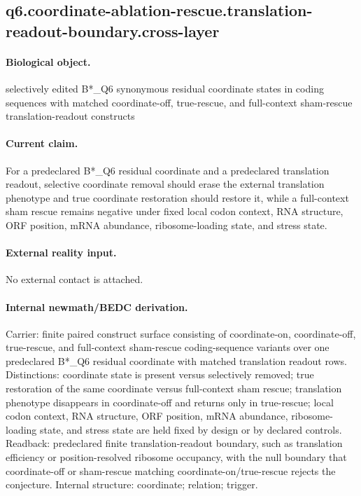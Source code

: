 \subsection{q6.coordinate-ablation-rescue.translation-readout-boundary.cross-layer}

\paragraph{Biological object.} selectively edited B*\_Q6 synonymous residual coordinate states in coding sequences with matched coordinate-off, true-rescue, and full-context sham-rescue translation-readout constructs

\paragraph{Current claim.} For a predeclared B*\_Q6 residual coordinate and a predeclared translation readout, selective coordinate removal should erase the external translation phenotype and true coordinate restoration should restore it, while a full-context sham rescue remains negative under fixed local codon context, RNA structure, ORF position, mRNA abundance, ribosome-loading state, and stress state.

\paragraph{External reality input.}
No external contact is attached.

\paragraph{Internal newmath/BEDC derivation.} Carrier: finite paired construct surface consisting of coordinate-on, coordinate-off, true-rescue, and full-context sham-rescue coding-sequence variants over one predeclared B*\_Q6 residual coordinate with matched translation readout rows. Distinctions: coordinate state is present versus selectively removed; true restoration of the same coordinate versus full-context sham rescue; translation phenotype disappears in coordinate-off and returns only in true-rescue; local codon context, RNA structure, ORF position, mRNA abundance, ribosome-loading state, and stress state are held fixed by design or by declared controls. Readback: predeclared finite translation-readout boundary, such as translation efficiency or position-resolved ribosome occupancy, with the null boundary that coordinate-off or sham-rescue matching coordinate-on/true-rescue rejects the conjecture. Internal structure: coordinate; relation; trigger.


